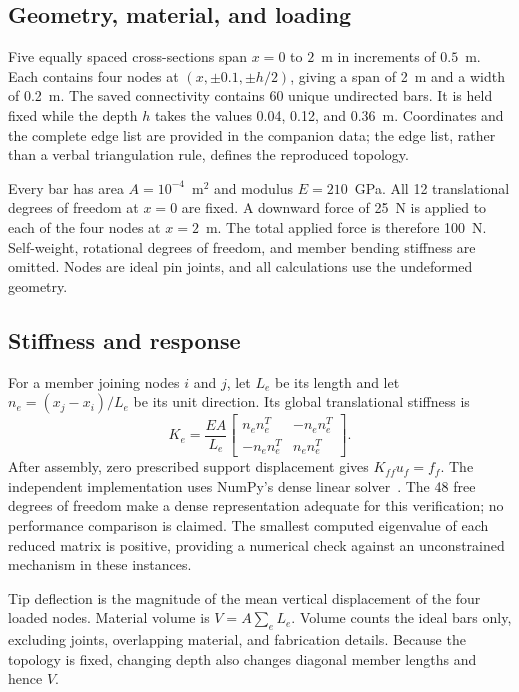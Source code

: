 \documentclass[conference]{IEEEtran}
\begin{document}
\subsection{Geometry, material, and loading}
Five equally spaced cross-sections span $x=0$ to $2$~m in increments of $0.5$~m. Each contains four nodes at $(x,\pm0.1,\pm h/2)$, giving a span of 2~m and a width of 0.2~m. The saved connectivity contains 60 unique undirected bars. It is held fixed while the depth $h$ takes the values 0.04, 0.12, and 0.36~m. Coordinates and the complete edge list are provided in the companion data; the edge list, rather than a verbal triangulation rule, defines the reproduced topology.

Every bar has area $A=10^{-4}$~m$^2$ and modulus $E=210$~GPa. All 12 translational degrees of freedom at $x=0$ are fixed. A downward force of 25~N is applied to each of the four nodes at $x=2$~m. The total applied force is therefore 100~N. Self-weight, rotational degrees of freedom, and member bending stiffness are omitted. Nodes are ideal pin joints, and all calculations use the undeformed geometry.

\subsection{Stiffness and response}
For a member joining nodes $i$ and $j$, let $L_e$ be its length and let $n_e=(x_j-x_i)/L_e$ be its unit direction. Its global translational stiffness is
\begin{equation}
 K_e=\frac{EA}{L_e}
 \begin{bmatrix} n_en_e^T&-n_en_e^T\\-n_en_e^T&n_en_e^T\end{bmatrix}.
 \label{eq:member}
\end{equation}
After assembly, zero prescribed support displacement gives $K_{ff}u_f=f_f$. The independent implementation uses NumPy's dense linear solver~\cite{numpy}. The 48 free degrees of freedom make a dense representation adequate for this verification; no performance comparison is claimed. The smallest computed eigenvalue of each reduced matrix is positive, providing a numerical check against an unconstrained mechanism in these instances.

Tip deflection is the magnitude of the mean vertical displacement of the four loaded nodes. Material volume is $V=A\sum_e L_e$. Volume counts the ideal bars only, excluding joints, overlapping material, and fabrication details. Because the topology is fixed, changing depth also changes diagonal member lengths and hence $V$.
\end{document}
